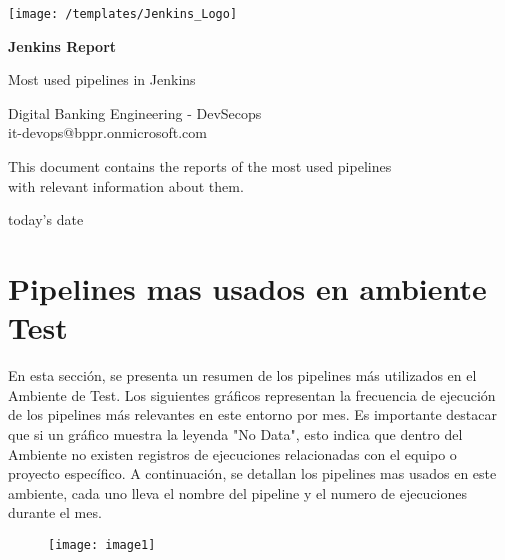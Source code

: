 \documentclass{article}
\makeatletter
\def \title{Jenkins Report}
\def \subtitle {Most used pipelines in Jenkins}
\def \authors{
    Digital Banking Engineering - DevSecops\\
    it-devops@bppr.onmicrosoft.com\\

}
\def \Description{
    This document contains the reports of the most used pipelines \\
    with relevant information about them.\\
}
\def \date{today's date}
\makeatother
\begin{document}
\begin{titlepage}
    \begin{center}
        \vspace*{0.7cm}
        
        \texttt{[image: /templates/Jenkins\_Logo]}\\
        
        \vspace{1cm}
        
        \Huge
        \textbf{\title}
            
        \vspace{0.5cm}
        \LARGE
        \subtitle
            
        \vspace{1cm}
        
        \large    
        \authors

        \vspace{2cm}
        
        \Description

        \vspace{2cm}

        \date
        
    \end{center}
\end{titlepage}

\section{Pipelines mas usados en ambiente Test}

\vspace{0.5cm}

En esta sección, se presenta un resumen de los pipelines más utilizados en el Ambiente de Test. Los siguientes gráficos representan la frecuencia de ejecución de los pipelines más relevantes en este entorno por mes.
Es importante destacar que si un gráfico muestra la leyenda "No Data", esto indica que dentro del Ambiente no existen registros de ejecuciones relacionadas con el equipo o proyecto específico.
A continuación, se detallan los pipelines mas usados en este ambiente, cada uno lleva el nombre del pipeline y el numero de ejecuciones durante el mes.

\vspace{0.8cm}

\begin{figure}[H]
    \centering
        \texttt{[image: image1]}\\
\end{figure}
\end{document}
